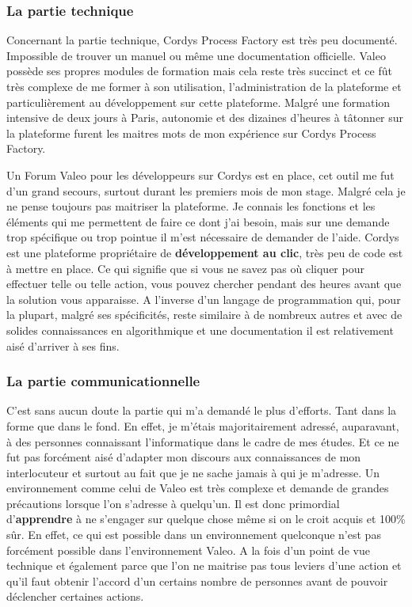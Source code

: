 \subsubsection{La partie technique}

Concernant la partie technique, Cordys Process Factory est très peu documenté. Impossible de trouver un manuel ou même une documentation officielle. Valeo possède ses propres modules de formation mais cela reste très succinct et ce fût très complexe de me former à  son utilisation, l'administration de la plateforme et particulièrement au développement sur cette plateforme. Malgré une formation intensive de deux jours à Paris, autonomie et des dizaines d'heures à tâtonner sur la plateforme furent les maitres mots de mon expérience sur Cordys Process Factory.

Un Forum Valeo pour les développeurs sur Cordys est en place, cet outil me fut d'un grand secours, surtout durant les premiers mois de mon stage.
Malgré cela je ne pense toujours pas maitriser la plateforme. Je connais les fonctions et les éléments qui me permettent de faire ce dont j'ai besoin, mais sur une demande trop spécifique ou trop pointue il m'est nécessaire de demander de l'aide. Cordys est une plateforme propriétaire de \textbf{développement au clic}, très peu de code est à mettre en place. Ce qui signifie que si vous ne savez pas où cliquer pour effectuer telle ou telle action, vous pouvez chercher pendant des heures avant que la solution vous apparaisse. A l'inverse d'un langage de programmation qui, pour la plupart, malgré ses spécificités, reste similaire à de nombreux autres et avec de solides connaissances en algorithmique et une documentation il est relativement aisé d'arriver à ses fins.

\subsubsection{La partie communicationnelle}

C'est sans aucun doute la partie qui m'a demandé le plus d'efforts. Tant dans la forme que dans le fond. En effet, je m'étais majoritairement adressé, auparavant, à des personnes connaissant l'informatique dans le cadre de mes études. Et ce ne fut pas forcément aisé d'adapter mon discours aux connaissances de mon interlocuteur et surtout au fait que je ne sache jamais à qui je m'adresse. Un environnement comme celui de Valeo est très complexe et demande de grandes précautions lorsque l'on s'adresse à quelqu'un. Il est donc primordial d'\textbf{apprendre} à ne s'engager sur quelque chose même si on le croit acquis et 100\% sûr. En effet, ce qui est possible dans un environnement quelconque n'est pas forcément possible dans l'environnement Valeo. A la fois d'un point de vue technique et également parce que l'on ne maitrise pas tous leviers d'une action et qu'il faut obtenir l'accord d'un certains nombre de personnes avant de pouvoir déclencher certaines actions.

